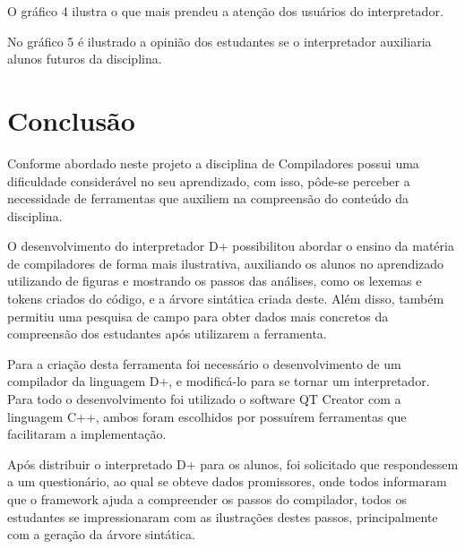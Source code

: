 \documentclass[12pt,oneside,a4paper,chapter=TITLE,section=TITLE,sumario=tradicional]{abntex2}
\begin{document}
O gráfico 4 ilustra o que mais prendeu a atenção dos usuários do interpretador.

\begin{grafico}[H]
\end{grafico}

No gráfico 5 é ilustrado a opinião dos estudantes se o interpretador auxiliaria alunos futuros da disciplina.

\begin{grafico}[H]
\end{grafico}

\chapter{Conclusão}
\label{cap:conclusao}

Conforme abordado neste projeto a disciplina de Compiladores possui uma dificuldade considerável no seu aprendizado, com isso, pôde-se perceber a necessidade de ferramentas que auxiliem na compreensão do conteúdo da disciplina.

O desenvolvimento do interpretador D+ possibilitou abordar o ensino da matéria de compiladores de forma mais ilustrativa, auxiliando os alunos no aprendizado utilizando de figuras e mostrando os passos das análises, como os lexemas e tokens criados do código, e a árvore sintática criada deste. Além disso, também permitiu uma pesquisa de campo para obter dados mais concretos da compreensão dos estudantes após utilizarem a ferramenta.

Para a criação desta ferramenta foi necessário o desenvolvimento de um compilador da linguagem D+, e modificá-lo para se tornar um interpretador. Para todo o desenvolvimento foi utilizado o software QT Creator com a linguagem C++, ambos foram escolhidos por possuírem ferramentas que facilitaram a implementação.

Após distribuir o interpretado D+ para os alunos, foi solicitado que respondessem a um questionário, ao qual se obteve dados promissores, onde todos informaram que o framework ajuda a compreender os passos do compilador, todos os estudantes se impressionaram com as ilustrações destes passos, principalmente com a geração da árvore sintática.
\end{document}

